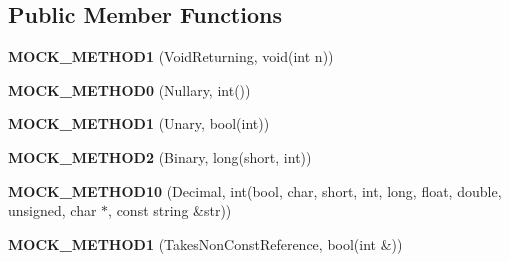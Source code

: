 \subsection*{Public Member Functions}
\begin{DoxyCompactItemize}
\item 
\mbox{\label{classtesting_1_1gmock__generated__function__mockers__test_1_1_mock_foo_a03e7f723e9909b031fc6df22f41aac7f}} 
{\bfseries M\+O\+C\+K\+\_\+\+M\+E\+T\+H\+O\+D1} (Void\+Returning, void(int n))
\item 
\mbox{\label{classtesting_1_1gmock__generated__function__mockers__test_1_1_mock_foo_a25b99ec3b994318b7ecb0578da113136}} 
{\bfseries M\+O\+C\+K\+\_\+\+M\+E\+T\+H\+O\+D0} (Nullary, int())
\item 
\mbox{\label{classtesting_1_1gmock__generated__function__mockers__test_1_1_mock_foo_a9f9ce709a5b13e319eeb348e6eae3d18}} 
{\bfseries M\+O\+C\+K\+\_\+\+M\+E\+T\+H\+O\+D1} (Unary, bool(int))
\item 
\mbox{\label{classtesting_1_1gmock__generated__function__mockers__test_1_1_mock_foo_a50f8c94d6fab258d49e1d4a15ea7a7af}} 
{\bfseries M\+O\+C\+K\+\_\+\+M\+E\+T\+H\+O\+D2} (Binary, long(short, int))
\item 
\mbox{\label{classtesting_1_1gmock__generated__function__mockers__test_1_1_mock_foo_aeb9b35bc4054018f6a80c811a58404e3}} 
{\bfseries M\+O\+C\+K\+\_\+\+M\+E\+T\+H\+O\+D10} (Decimal, int(bool, char, short, int, long, float, double, unsigned, char $\ast$, const string \&str))
\item 
\mbox{\label{classtesting_1_1gmock__generated__function__mockers__test_1_1_mock_foo_a785cbef820189a974170cea52b0d97d9}} 
{\bfseries M\+O\+C\+K\+\_\+\+M\+E\+T\+H\+O\+D1} (Takes\+Non\+Const\+Reference, bool(int \&))
\item 
\mbox{\label{classtesting_1_1gmock__generated__function__mockers__test_1_1_mock_foo_a605c84c3375d02769b0288d7637b552f}} 

\end{DoxyCompactItemize}

